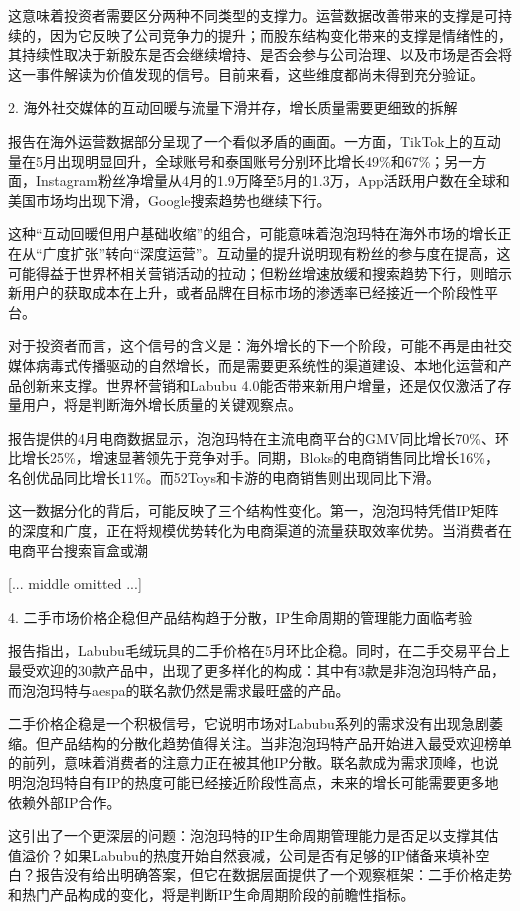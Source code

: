 \documentclass[11pt]{ctexart}
\begin{document}
这意味着投资者需要区分两种不同类型的支撑力。运营数据改善带来的支撑是可持续的，因为它反映了公司竞争力的提升；而股东结构变化带来的支撑是情绪性的，其持续性取决于新股东是否会继续增持、是否会参与公司治理、以及市场是否会将这一事件解读为价值发现的信号。目前来看，这些维度都尚未得到充分验证。

2. 海外社交媒体的互动回暖与流量下滑并存，增长质量需要更细致的拆解

报告在海外运营数据部分呈现了一个看似矛盾的画面。一方面，TikTok上的互动量在5月出现明显回升，全球账号和泰国账号分别环比增长49\%和67\%；另一方面，Instagram粉丝净增量从4月的1.9万降至5月的1.3万，App活跃用户数在全球和美国市场均出现下滑，Google搜索趋势也继续下行。

这种“互动回暖但用户基础收缩”的组合，可能意味着泡泡玛特在海外市场的增长正在从“广度扩张”转向“深度运营”。互动量的提升说明现有粉丝的参与度在提高，这可能得益于世界杯相关营销活动的拉动；但粉丝增速放缓和搜索趋势下行，则暗示新用户的获取成本在上升，或者品牌在目标市场的渗透率已经接近一个阶段性平台。

对于投资者而言，这个信号的含义是：海外增长的下一个阶段，可能不再是由社交媒体病毒式传播驱动的自然增长，而是需要更系统性的渠道建设、本地化运营和产品创新来支撑。世界杯营销和Labubu 4.0能否带来新用户增量，还是仅仅激活了存量用户，将是判断海外增长质量的关键观察点。

报告提供的4月电商数据显示，泡泡玛特在主流电商平台的GMV同比增长70\%、环比增长25\%，增速显著领先于竞争对手。同期，Bloks的电商销售同比增长16\%，名创优品同比增长11\%。而52Toys和卡游的电商销售则出现同比下滑。

这一数据分化的背后，可能反映了三个结构性变化。第一，泡泡玛特凭借IP矩阵的深度和广度，正在将规模优势转化为电商渠道的流量获取效率优势。当消费者在电商平台搜索盲盒或潮

[... middle omitted ...]

4. 二手市场价格企稳但产品结构趋于分散，IP生命周期的管理能力面临考验

报告指出，Labubu毛绒玩具的二手价格在5月环比企稳。同时，在二手交易平台上最受欢迎的30款产品中，出现了更多样化的构成：其中有3款是非泡泡玛特产品，而泡泡玛特与aespa的联名款仍然是需求最旺盛的产品。

二手价格企稳是一个积极信号，它说明市场对Labubu系列的需求没有出现急剧萎缩。但产品结构的分散化趋势值得关注。当非泡泡玛特产品开始进入最受欢迎榜单的前列，意味着消费者的注意力正在被其他IP分散。联名款成为需求顶峰，也说明泡泡玛特自有IP的热度可能已经接近阶段性高点，未来的增长可能需要更多地依赖外部IP合作。

这引出了一个更深层的问题：泡泡玛特的IP生命周期管理能力是否足以支撑其估值溢价？如果Labubu的热度开始自然衰减，公司是否有足够的IP储备来填补空白？报告没有给出明确答案，但它在数据层面提供了一个观察框架：二手价格走势和热门产品构成的变化，将是判断IP生命周期阶段的前瞻性指标。
\end{document}
